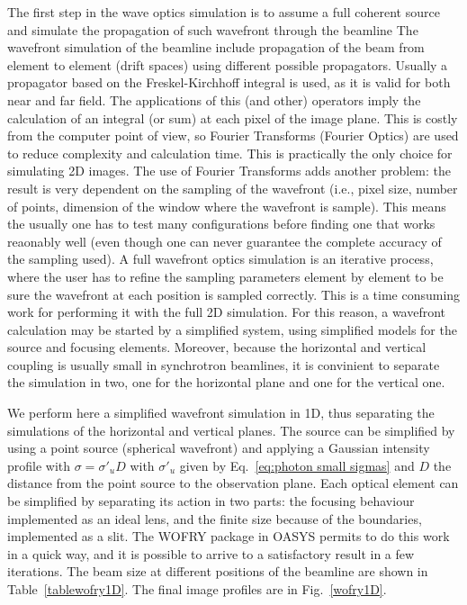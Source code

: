 \documentclass{iucr}              %
\begin{document}
The first step in the wave optics simulation is to assume a full coherent source and simulate the propagation of such wavefront through the beamline
The wavefront simulation of the beamline include propagation of the beam from element to element (drift spaces) using different possible propagators. Usually a propagator based on the Freskel-Kirchhoff integral is used, as it is valid for both near and far field. The applications of this (and other) operators imply the calculation of an integral (or sum) at each pixel of the image plane. This is costly from the computer point of view, so Fourier Transforms (Fourier Optics) are used to reduce complexity and calculation time. This is practically the only choice for simulating 2D images. The use of Fourier Transforms adds another problem: the result is very dependent on the sampling of the wavefront (i.e., pixel size, number of points, dimension of the window where the wavefront is sample). This means the usually one has to test many configurations before finding one that works reaonably well (even though one can never guarantee the complete accuracy of the sampling used). A full wavefront optics simulation is an iterative process, where the user has to refine the sampling parameters element by element to be sure the wavefront at each position is sampled correctly. This is a time consuming work for performing it with the full 2D simulation. For this reason, a wavefront calculation may be started by a simplified system, using simplified models for the source and focusing elements. Moreover, because the horizontal and vertical coupling is usually small in synchrotron beamlines, it is convinient to separate the simulation in two, one for the horizontal plane and one for the vertical one. 

We perform here a simplified wavefront simulation in 1D, thus separating the simulations of the horizontal and vertical planes. The source can be simplified by using a point source (spherical wavefront) and applying a Gaussian intensity profile with $\sigma=\sigma'_u D$ with $\sigma'_u$ given by Eq.~\ref{eq:photon small sigmas} and $D$ the distance from the point source to the observation plane. Each optical element can be simplified by separating its action in two parts: the focusing behaviour implemented as an ideal lens, and the finite size because of the boundaries, implemented as a slit. The WOFRY package in OASYS permits to do this work in a quick way, and it is possible to arrive to a satisfactory result in a few iterations. The beam size at different positions of the beamline are shown in Table~\ref{tablewofry1D}. The final image profiles are in Fig.~\ref{wofry1D}.
\end{document}
